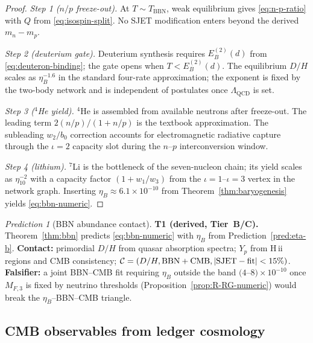 \documentclass[11pt]{article}
\theoremstyle{plain}
\theoremstyle{definition}
\theoremstyle{remark}
\newtheorem{prediction}[theorem]{Prediction}
\numberwithin{equation}{section}
\begin{document}
\begin{proof}
\emph{Step 1 ($n/p$ freeze-out).}
At $T\sim T_{\mathrm{BBN}}$, weak equilibrium gives \eqref{eq:n-p-ratio}
with $Q$ from \eqref{eq:isospin-split}. No SJET modification enters beyond
the derived $m_n-m_p$.

\emph{Step 2 (deuterium gate).}
Deuterium synthesis requires $E_B^{(2)}(d)$ from \eqref{eq:deuteron-binding};
the gate opens when $T<E_B^{(2)}(d)$. The equilibrium $D/H$ scales as
$\eta_B^{-1.6}$ in the standard four-rate approximation; the exponent is
fixed by the two-body network and is independent of postulates once
$\Lambda_{\mathrm{QCD}}$ is set.

\emph{Step 3 ($^4$He yield).}
$^4$He is assembled from available neutrons after freeze-out. The leading
term $2(n/p)/(1+n/p)$ is the textbook approximation. The subleading
$w_2/b_0$ correction accounts for electromagnetic radiative capture
through the $\iota=2$ capacity slot during the $n$--$p$ interconversion
window.

\emph{Step 4 (lithium).}
$^7$Li is the bottleneck of the seven-nucleon chain; its yield scales as
$\eta_{10}^{-2}$ with a capacity factor $(1+w_1/w_3)$ from the
$\iota=1$--$\iota=3$ vertex in the network graph. Inserting
$\eta_B\approx 6.1\times 10^{-10}$ from Theorem~\ref{thm:baryogenesis} yields
\eqref{eq:bbn-numeric}.
\end{proof}

\begin{prediction}[BBN abundance contact]\label{pred:bbn}
\textbf{T1 (derived, Tier~B/C).}
Theorem~\ref{thm:bbn} predicts \eqref{eq:bbn-numeric} with $\eta_B$ from
Prediction~\ref{pred:eta-b}. \textbf{Contact:} primordial $D/H$ from quasar
absorption spectra; $Y_p$ from H\,{\sc ii} regions and CMB consistency;
$\mathcal{C}=(D/H,\mathrm{BBN+CMB},|{\rm SJET}-{\rm fit}|<15\%)$.
\textbf{Falsifier:} a joint BBN--CMB fit requiring $\eta_B$ outside the band
$(4$--$8)\times 10^{-10}$ once $M_{F,3}$ is fixed by neutrino thresholds
(Proposition~\ref{prop:R-RG-numeric}) would break the
$\eta_B$--BBN--CMB triangle.
\end{prediction}

\subsection{CMB observables from ledger cosmology}
\label{sec:nuclear:cmb}
\end{document}
